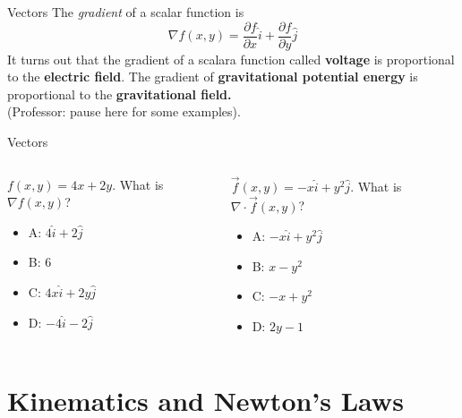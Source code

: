 \documentclass{beamer}
\begin{document}
\begin{frame}{Vectors}
The \textit{gradient} of a scalar function is \\
\begin{equation}
\nabla f(x,y) = \frac{\partial f}{\partial x}\hat{i}+\frac{\partial f}{\partial y}\hat{j}
\end{equation}
It turns out that the gradient of a scalara function called \textbf{voltage} is proportional to the \textbf{electric field}.  The gradient of \textbf{gravitational potential energy} is proportional to the \textbf{gravitational field.} \\ \vspace{0.5cm}
(Professor: pause here for some examples).
\end{frame}

\begin{frame}{Vectors}
\small
\begin{columns}[T]
\begin{column}{0.5\textwidth}
$f(x,y) = 4x+2y$.  What is $\nabla f(x,y)$?
\begin{itemize}
\item A: $4\hat{i}+2\hat{j}$
\item B: $6$
\item C: $4x\hat{i}+2y\hat{j}$
\item D: $-4\hat{i}-2\hat{j}$
\end{itemize}
\end{column}
\begin{column}{0.5\textwidth}
$\vec{f}(x,y) = -x\hat{i}+y^2\hat{j}$.  What is $\nabla \cdot \vec{f}(x,y)$?
\begin{itemize}
\item A: $-x\hat{i}+y^2\hat{j}$
\item B: $x-y^2$
\item C: $-x+y^2$
\item D: $2y-1$
\end{itemize}
\end{column}
\end{columns}
\end{frame}

\section{Kinematics and Newton's Laws}
\end{document}
